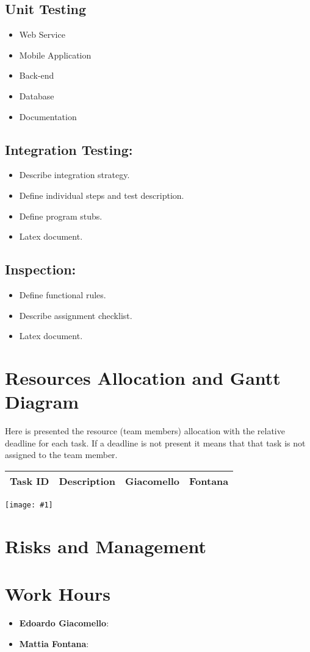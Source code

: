 \documentclass[11pt, a4paper,titlepage]{article}
\newcommand{\image}[1]{
	\begin{center}
		\noindent \texttt{[image: \#1]}
	\end{center}
}
\begin{document}
	\subsection{Unit Testing}
	\begin{itemize}
		\item Web Service
		\item Mobile Application
		\item Back-end
		\item Database
		\item Documentation
	\end{itemize}
	
		
		\subsection{Integration Testing:}
		\begin{itemize}
			\item Describe integration strategy.
			\item Define individual steps and test description.
			\item Define program stubs.
			\item Latex document.
		\end{itemize}
	
	
	\subsection{Inspection:}
	\begin{itemize}
		\item Define functional rules.
		\item Describe assignment checklist.
		\item Latex document.
	\end{itemize}
	
	\section{Resources Allocation and Gantt Diagram}
	Here is presented the resource (team members) allocation with the relative deadline for each task. If a deadline is not present it means that that task is not assigned to the team member.
	\newline
	\begin{tabularx}{\textwidth}{|X|c|c|c|}
		\hline
		\textbf{Task ID} &	\textbf{Description} & \textbf{Giacomello} & \textbf{Fontana} \\
		
		\hline
	\end{tabularx}
	\newline
	\image{ganttdiagramm.png}
	\section{Risks and Management}

	\section{Work Hours}
		\begin{itemize}
			\item \textbf{Edoardo Giacomello}: 
			\item \textbf{Mattia Fontana}: 
		\end{itemize}	
\end{document}
